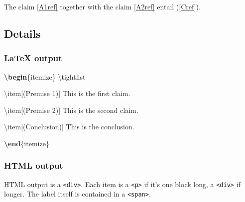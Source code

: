 \documentclass[
]{article}
\newenvironment{Shaded}{}{}
\newcommand{\ExtensionTok}[1]{#1}
\newcommand{\FunctionTok}[1]{\textcolor[rgb]{0.02,0.16,0.49}{#1}}
\newcommand{\KeywordTok}[1]{\textcolor[rgb]{0.00,0.44,0.13}{\textbf{#1}}}
\newcommand{\NormalTok}[1]{#1}
\begin{document}
The claim \ref{A1ref} together with the claim \ref{A2ref} entail
(\ref{Cref}).

\hypertarget{details}{%
\subsection{Details}\label{details}}

\hypertarget{latex-output}{%
\subsubsection{LaTeX output}\label{latex-output}}

\begin{Shaded}
\begin{Highlighting}[]
\KeywordTok{\textbackslash{}begin}\NormalTok{\{}\ExtensionTok{itemize}\NormalTok{\}}
\FunctionTok{\textbackslash{}tightlist}

\FunctionTok{\textbackslash{}item}\NormalTok{[(Premise 1)] This is the first claim.}

\FunctionTok{\textbackslash{}item}\NormalTok{[(Premise 2)] This is the second claim.}

\FunctionTok{\textbackslash{}item}\NormalTok{[(Conclusion)] This is the conclusion.}

\KeywordTok{\textbackslash{}end}\NormalTok{\{}\ExtensionTok{itemize}\NormalTok{\}}
\end{Highlighting}
\end{Shaded}

\hypertarget{html-output}{%
\subsubsection{HTML output}\label{html-output}}

HTML output is a \texttt{\textless{}div\textgreater{}}. Each item is a
\texttt{\textless{}p\textgreater{}} if it's one block long, a
\texttt{\textless{}div\textgreater{}} if longer. The label itself is
contained in a \texttt{\textless{}span\textgreater{}}.
\end{document}
